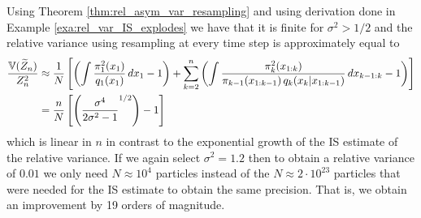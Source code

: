 \begin{comment}
		For \(k\geq 2\), note that with resampling at time \(k-1\) the particles \(X_{1:k-1}^{(i)}\) are i.i.d. draws from (approximately) \(\pi_{k-1}\). The variance of the incremental estimator is then
		\[
		\Var_\text{ISR}\left[\widehat{\frac{Z_k}{Z_{k-1}}}\right]
		=\frac{1}{N}\left(\int \frac{\gamma_k^2(x_{1:k})}{\gamma_{k-1}(x_{1:k-1})\,q_k(x_k\vert x_{1:k-1})}\,dx_{k-1:k}-\left(\frac{Z_k}{Z_{k-1}}\right)^2\right).
		\]
		Using the identity \(\gamma_k(x_{1:k}) = Z_k\,\pi_k(x_{1:k})\), we can rewrite this as
		\[
		\Var_\text{ISR}\left[\widehat{\frac{Z_k}{Z_{k-1}}}\right]
		=\frac{Z_k^2}{N\,Z_{k-1}}\left(\int \frac{\pi_k^2(x_{1:k})}{\pi_{k-1}(x_{1:k-1})\,q_k(x_k\vert x_{1:k-1})}\,dx_{k-1:k}-1\right).
		\]
		Thus, for \(k\ge 2\), since \(\epsilon_k\) is the relative error in estimating \(Z_k/Z_{k-1}\), we have
		\[
		\Var(\epsilon_k) = \frac{1}{N}\left(\int \frac{\pi_k^2(x_{1:k})}{\pi_{k-1}(x_{1:k-1})\,q_k(x_k\vert x_{1:k-1})}\,dx_{k-1:k}-1\right).
		\]
		Therefore, the total variance on the log scale is approximately
		\[
		\Var\Bigl(\log \widehat{Z}_n\Bigr) \approx \frac{1}{N}\left[\left(\int \frac{\pi_1^2(x_1)}{q_1(x_1)}\,dx_1-1\right)
		+\sum_{k=2}^n\left(\int \frac{\pi_k^2(x_{1:k})}{\pi_{k-1}(x_{1:k-1})\,q_k(x_k\vert x_{1:k-1})}\,dx_{k-1:k}-1\right)\right].
		\]
		
		Finally, we apply the delta method to transfer the variance from the logarithmic scale back to the original scale. Since for the function \(g(x)=\exp(x)\) we have \(g'(\log Z_n)=Z_n\), the delta method implies
		\[
		\Var\Bigl(\log \widehat{Z}_n\Bigr) \approx \frac{\Var(\widehat{Z}_n)}{Z_n^2},
		\]
		and hence the asymptotic relative variance is
		\[
		\frac{\Var(\widehat{Z}_n)}{Z_n^2}= \frac{1}{N}\left[\left(\int \frac{\pi_1^2(x_1)}{q_1(x_1)}\,dx_1-1\right)
		+\sum_{k=2}^n\left(\int \frac{\pi_k^2(x_{1:k})}{\pi_{k-1}(x_{1:k-1})\,q_k(x_k\vert x_{1:k-1})}\,dx_{k-1:k}-1\right)\right],
		\]
		as desired.
	\end{proof}
\end{comment} 
\begin{example}
	\label{exa:rel_var_IS_explodes_cont}
	Using Theorem \ref{thm:rel_asym_var_resampling} and using derivation done in Example \ref{exa:rel_var_IS_explodes} we have that it is finite for $\sigma^2>1/2$ and the relative variance using resampling at every time step is approximately equal to
	\begin{align*}
		\frac{\operatorname{\mathbb{V}}(\widetilde{Z}_n)}{Z_n^2}&\approx\frac{1}{N}\left[\left(\int 	\frac{\pi_1^2(x_1)}{q_1(x_1)}\,dx_1-1\right)+\sum_{k=2}^n\left(\int \frac{\pi_k^2(x_{1:k})}{\pi_{k-1}(x_{1:k-1})\,q_k(x_k\vert x_{1:k-1})}\,dx_{k-1:k}-1\right)\right] \\
		&=\frac{n}{N}\left[\left(\frac{\sigma^4}{2\sigma^2-1}^{1/2}\right)-1\right]
	\end{align*}
	which is linear in $n$ in contrast to the exponential growth of the IS estimate of the relative variance. If we again select $\sigma^2=1.2$ then to obtain a relative variance of $0.01$ we only need $N\approx 10^4$ particles instead of the $N\approx 2\cdot 10^{23}$ particles that were needed for the IS estimate to obtain the same precision. That is, we obtain an improvement by 19 orders of magnitude.
\end{example} 
